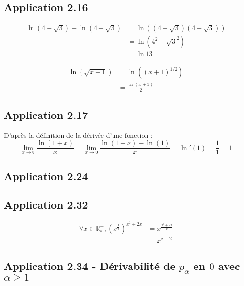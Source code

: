 \documentclass{report}
\begin{document}
\subsection*{Application 2.16}

\begin{equation*}
	\begin{split}
		\ln(4-\sqrt{3}) + \ln(4+\sqrt{3})
		&= \ln ((4-\sqrt{3})(4+\sqrt{3}))\\
		&= \ln (4^2-\sqrt{3}^2) \\
		&= \ln 13
	\end{split}
\end{equation*}

\begin{equation*}
	\begin{split}
		\ln(\sqrt{x+1})
		&= 	\ln((x+1)^{1/2})\\
		&= \frac{\ln(x+1)}{2}
	\end{split}
\end{equation*}

\subsection*{Application 2.17}
D'après la définition de la dérivée d'une fonction :
\begin{displaymath}
\lim_{x \rightarrow 0} \frac{\ln(1+x)}{x} = \lim_{x \rightarrow 0} \frac{\ln(1+x) - \ln(1)}{x} = \ln'(1) = \frac{1}{1} = 1
\end{displaymath}


\subsection*{Application 2.24}


\subsection*{Application 2.32}
\begin{equation*}
	\begin{split}
		\forall x \in \mathbb{R}^{+}_{*}, \left(  x^{\frac{1}{x}} \right)^{x^2+2x}
		&= x^{\frac{x^2+2x}{x}} \\
		&= x^{x+2}
	\end{split}
\end{equation*}


\subsection*{Application 2.34 - Dérivabilité de $p_{\alpha}$ en $0$ avec $\alpha \geq 1$}
\end{document}

